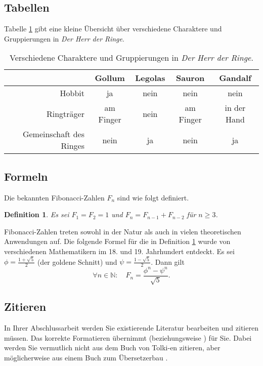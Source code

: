 \documentclass[11pt,a4paper]{article}
\begin{document}
\subsection{Tabellen}
Tabelle \ref{HdRTab} gibt eine kleine Übersicht über verschiedene Charaktere und Gruppierungen in \emph{Der Herr der Ringe}.

\begin{table}[b]
	\begin{tabular}{|r|c|c|c|c|}
		\hline
				& Gollum	& Legolas	& Sauron	& Gandalf \\
		\hline
		\hline
		Hobbit	& ja	& nein	& nein	& nein \\
		\hline
		Ringträger	& am Finger	& nein	& am Finger	& in der Hand \\
		\hline
		Gemeinschaft des Ringes	& nein	& ja	& nein	& ja \\
		\hline
	\end{tabular}
	\caption{Verschiedene Charaktere und Gruppierungen in \emph{Der Herr der Ringe}.}
	\label{HdRTab}
\end{table}

\subsection{Formeln}
Die bekannten Fibonacci-Zahlen $F_n$ sind wie folgt definiert.
\newtheorem{defn}{Definition}
\begin{defn}\label{fibonacci}
	Es sei $F_1 = F_2 = 1$ und $F_n = F_{n-1} + F_{n-2}$ für $n \geq 3$.
\end{defn}
Fibonacci-Zahlen treten sowohl in der Natur als auch in vielen theoretischen Anwendungen auf. Die folgende Formel für die in Definition \ref{fibonacci} wurde von verschiedenen Mathematikern im 18. und 19. Jahrhundert entdeckt. Es sei $\phi = \frac{1 + \sqrt{5}}{2}$ (der goldene Schnitt) und $\psi = \frac{1 - \sqrt{5}}{2}$. Dann gilt
\[ \forall n \in \mathbb{N}: \quad F_n = \frac{\phi^n - \psi^n}{\sqrt{5}}. \]

\subsection{Zitieren}
In Ihrer Abschlussarbeit werden Sie existierende Literatur bearbeiten und zitieren müssen. Das korrekte Formatieren übernimmt  (beziehungsweise ) für Sie. Dabei werden Sie vermutlich nicht aus dem Buch von Tolki-\linebreak en \cite{HdR1954} zitieren, aber möglicherweise aus einem Buch zum Übersetzerbau \cite{compilers2006}.



\end{document}
